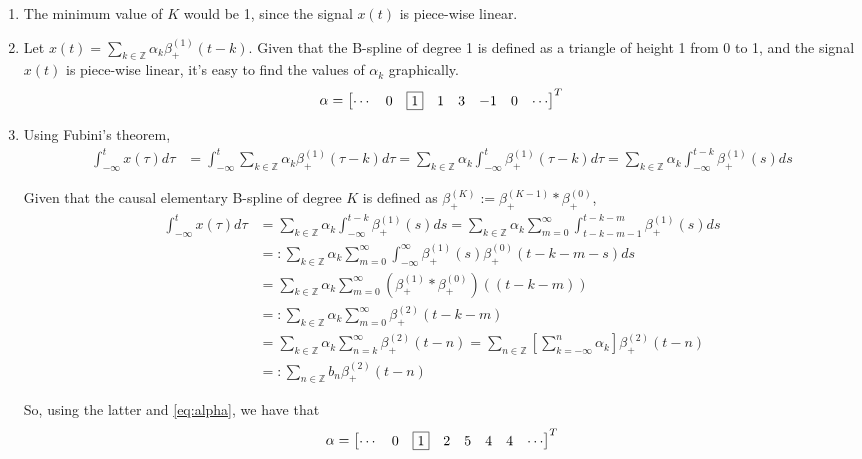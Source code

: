 \documentclass{article}
\begin{document}
    \begin{enumerate}
        \item The minimum value of $K$ would be 1, since the signal $x(t)$ is piece-wise linear.
        \item Let $x(t)=\sum_{k \in \mathbb{Z}}\alpha_k \beta_+^{(1)}(t-k)$. Given that the B-spline of degree 1 is defined as a triangle of height 1 from 0 to 1, and the signal $x(t)$ is piece-wise linear, it's easy to find the values of $\alpha_k$ graphically.
        \begin{align}
            \alpha = \begin{bmatrix}
                \cdots &
                0 &
                \fbox{1} &
                1 &
                3 &
                -1 &
                0 &
                \cdots
            \end{bmatrix}^T
            \label{eq:alpha}
        \end{align}
        \item Using Fubini's theorem,
        \begin{align}
            \int_{-\infty}^t x(\tau) d\tau &= \int_{-\infty}^t\sum_{k \in \mathbb{Z}}\alpha_k \beta_+^{(1)}(\tau-k) d\tau=\sum_{k \in \mathbb{Z}}\alpha_k \int_{-\infty}^t \beta_+^{(1)}(\tau-k) d\tau =\sum_{k \in \mathbb{Z}}\alpha_k \int_{-\infty}^{t-k} \beta_+^{(1)}(s) ds 
        \end{align}
        
        Given that the causal elementary B-spline of degree $K$ is defined as $\beta_+^{(K)}:=\beta_+^{(K-1)} \ast \beta_+^{(0)}$,
        \begin{align}
        \int_{-\infty}^t x(\tau) d\tau  &= \sum_{k \in \mathbb{Z}}\alpha_k \int_{-\infty}^{t-k} \beta_+^{(1)}(s) ds= \sum_{k \in \mathbb{Z}}\alpha_k \sum_{m=0}^{\infty}\int_{t-k-m-1}^{t-k-m} \beta_+^{(1)}(s) ds \\
        &=: \sum_{k \in \mathbb{Z}}\alpha_k\sum_{m=0}^{\infty}\int_{-\infty}^{\infty} \beta_+^{(1)}(s) \beta_+^{(0)}(t-k-m-s) ds \\
        &= \sum_{k \in \mathbb{Z}}\alpha_k\sum_{m=0}^{\infty} (\beta_+^{(1)} \ast  \beta_+^{(0)})((t-k-m)) 
        \\&=: \sum_{k \in \mathbb{Z}}\alpha_k\sum_{m=0}^{\infty} \beta_+^{(2)}(t-k-m) \\
        &=\sum_{k \in \mathbb{Z}}\alpha_k \sum_{n=k}^{\infty} \beta_+^{(2)}(t-n)=\sum_{n \in \mathbb{Z}} \left[\sum_{k=-\infty}^{n}\alpha_k \right] \beta_+^{(2)}(t-n) \\
        &=: \sum_{n \in \mathbb{Z}} b_n \beta_+^{(2)}(t-n)
        \end{align}
        
        So, using the latter and \eqref{eq:alpha}, we have that
        \begin{align}
            \alpha = \begin{bmatrix}
                \cdots &
                0 &
                \fbox{1} &
                2 &
                5 &
                4 &
                4 &
                \cdots
            \end{bmatrix}^T
        \end{align}
        
    \end{enumerate}
\end{document}
